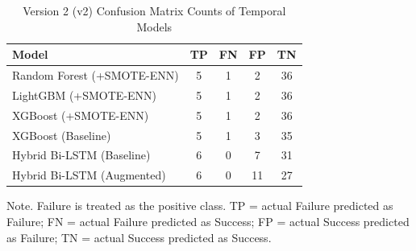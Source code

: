 \documentclass[12pt]{article}
\renewcommand{\_}{\textunderscore\allowbreak}
\begin{document}
\begin{table}[H]
\caption{Version 2 (v2) Confusion Matrix Counts of Temporal Models}
\label{tab:temporal_confusion_v2}
\small
\begin{tabular}{lcccc}
\toprule
Model & TP & FN & FP & TN \\
\midrule
Random Forest (+SMOTE-ENN) & 5 & 1 & 2 & 36 \\
LightGBM (+SMOTE-ENN) & 5 & 1 & 2 & 36 \\
XGBoost (+SMOTE-ENN) & 5 & 1 & 2 & 36 \\
XGBoost (Baseline) & 5 & 1 & 3 & 35 \\
Hybrid Bi-LSTM (Baseline) & 6 & 0 & 7 & 31 \\
Hybrid Bi-LSTM (Augmented) & 6 & 0 & 11 & 27 \\
\bottomrule
\end{tabular}

\begin{flushleft}
\footnotesize
Note. Failure is treated as the positive class. TP = actual Failure predicted as Failure; FN = actual Failure predicted as Success; FP = actual Success predicted as Failure; TN = actual Success predicted as Success.
\end{flushleft}
\end{table}

\begin{table}[H]
\caption{Methodological Differences Between Temporal Modeling Iterations (v1 vs v2)}
\label{tab:temporal_v1_v2_method_comparison}
\end{table}
\end{document}
